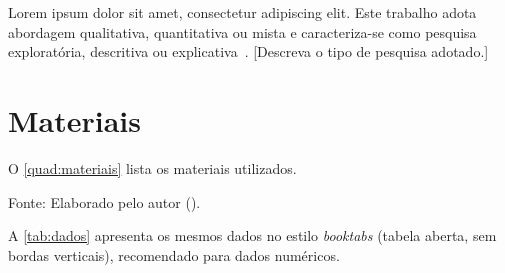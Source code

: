 
Lorem ipsum dolor sit amet, consectetur adipiscing elit. Este trabalho adota
abordagem qualitativa, quantitativa ou mista e caracteriza-se como pesquisa
exploratória, descritiva ou explicativa~\parencite{exemplo-livro}. [Descreva o
tipo de pesquisa adotado.]

\section{Materiais}
\label{sec:materiais}

O \autoref{quad:materiais} lista os materiais utilizados.

\begin{quadro}[!htb]
  \caption{Materiais e instrumentos utilizados.}
  \label{quad:materiais}
  \centering
  {Fonte: Elaborado pelo autor (\the\year{}).}
\end{quadro}

A \autoref{tab:dados} apresenta os mesmos dados no estilo \textit{booktabs}
(tabela aberta, sem bordas verticais), recomendado para dados numéricos.

